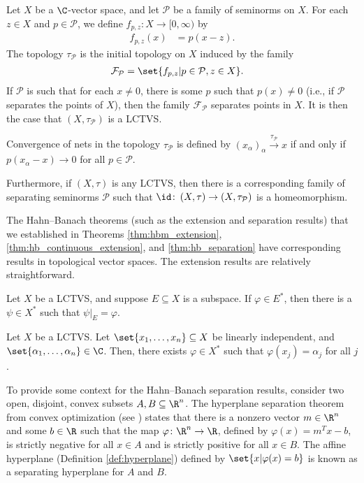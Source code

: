 \begin{proposition}\label{prop:structure_of_lctvs}
  Let $X$ be a $\C$-vector space, and let $\mathcal{P}$ be a family of seminorms on $X$. For each $z\in X$ and $p\in \mathcal{P}$, we define $f_{p,z}\colon X\rightarrow [0,\infty)$ by
  \begin{align*}
    f_{p,z}(x) &= p\left(x-z\right).
  \end{align*}
  The topology $\tau_{\mathcal{P}}$ is the initial topology on $X$ induced by the family
  \begin{align*}
    \mathcal{F}_{\mathcal{P}} &= \set{f_{p,z} | p\in \mathcal{P},z\in X}.
  \end{align*}
  If $\mathcal{P}$ is such that for each $x\neq 0$, there is some $p$ such that $p(x)\neq 0$ (i.e., if $\mathcal{P}$ separates the points of $X$), then the family $\mathcal{F}_{\mathcal{P}}$ separates points in $X$. It is then the case that $\left(X,\tau_{\mathcal{P}}\right)$ is a LCTVS.\newline

  Convergence of nets in the topology $\tau_{\mathcal{P}}$ is defined by $\left(x_{\alpha}\right)_{\alpha}\xrightarrow{\tau_{\mathcal{P}}}x$ if and only if $p\left(x_{\alpha}-x\right)\rightarrow 0$ for all $p\in \mathcal{P}$.\newline

  Furthermore, if $\left(X,\tau\right)$ is any LCTVS, then there is a corresponding family of separating seminorms $\mathcal{P}$ such that $\id\colon\left(X,\tau\right)\rightarrow \left(X,\tau_{\mathcal{P}}\right)$ is a homeomorphism.
\end{proposition}
The Hahn--Banach theorems (such as the extension and separation results) that we established in Theorems \ref{thm:hbm_extension}, \ref{thm:hb_continuous_extension}, and \ref{thm:hb_separation} have corresponding results in topological vector spaces. The extension results are relatively straightforward.
\begin{theorem}\label{thm:hb_continuous_extension_lctvs}
  Let $X$ be a LCTVS, and suppose $E\subseteq X$ is a subspace. If $\varphi\in E^{\ast}$, then there is a $\psi\in X^{\ast}$ such that $\psi|_{E} = \varphi$.
\end{theorem}
\begin{corollary}
  Let $X$ be a LCTVS. Let $\set{x_1,\dots,x_n}\subseteq X$ be linearly independent, and $\set{\alpha_1,\dots,\alpha_n}\in \C$. Then, there exists $\varphi\in X^{\ast}$ such that $\varphi\left(x_j\right) = \alpha_j$ for all $j$.
\end{corollary}
To provide some context for the Hahn--Banach separation results, consider two open, disjoint, convex subsets $A,B\subseteq \R^n$. The hyperplane separation theorem from convex optimization (see \cite[Chapter 2.6]{convex_optimization}) states that there is a nonzero vector $m\in \R^n$ and some $b\in \R$ such that the map $\varphi\colon \R^n\rightarrow \R$, defined by $\varphi(x) = m^{T}x - b$, is strictly negative for all $x\in A$ and is strictly positive for all $x\in B$. The affine hyperplane (Definition \ref{def:hyperplane}) defined by $\set{x | \varphi(x) = b}$ is known as a separating hyperplane for $A$ and $B$.\newline


